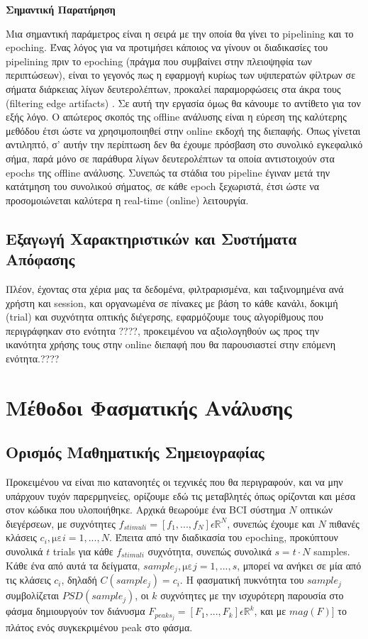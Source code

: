 \documentclass[11pt,a4paper,english,greek,twoside]{../Thesis}
\begin{document}
\textbf{Σημαντική Παρατήρηση}
\par Μια σημαντική παράμετρος είναι η σειρά με την οποία θα γίνει το pipelining και το epoching. Ένας λόγος για να προτιμήσει κάποιος να γίνουν οι διαδικασίες του pipelining πριν το epoching (πράγμα που συμβαίνει στην πλειοψηφία των περιπτώσεων), είναι το γεγονός πως η εφαρμογή κυρίως των υψιπερατών φίλτρων σε σήματα διάρκειας λίγων δευτερολέπτων, προκαλεί παραμορφώσεις στα άκρα τους (filtering edge artifacts) \cite{noauthor_undated-rl}\cite{Luck2014-mg}. Σε αυτή την εργασία όμως θα κάνουμε το αντίθετο για τον εξής λόγο. Ο απώτερος σκοπός της offline ανάλυσης είναι η εύρεση της καλύτερης μεθόδου έτσι ώστε να χρησιμοποιηθεί στην online εκδοχή της διεπαφής. Όπως γίνεται αντιληπτό, σ' αυτήν την περίπτωση δεν θα έχουμε πρόσβαση στο συνολικό εγκεφαλικό σήμα, παρά μόνο σε παράθυρα λίγων δευτερολέπτων τα οποία αντιστοιχούν στα epochs της offline ανάλυσης. Συνεπώς τα στάδια του pipeline έγιναν μετά την κατάτμηση του συνολικού σήματος, σε κάθε epoch ξεχωριστά, έτσι ώστε να προσομοιώνεται καλύτερα η real-time (online) λειτουργία.

\subsection{Εξαγωγή Χαρακτηριστικών και Συστήματα Απόφασης}
\label{subsec:featureExtract}
\par Πλέον, έχοντας στα χέρια μας τα δεδομένα, φιλτραρισμένα, και ταξινομημένα ανά χρήστη και session, και οργανωμένα σε πίνακες με βάση το κάθε κανάλι, δοκιμή (trial) και συχνότητα οπτικής διέγερσης, εφαρμόζουμε τους αλγορίθμους που περιγράφηκαν στο ενότητα ????, προκειμένου να αξιολογηθούν ως προς την ικανότητα χρήσης τους στην online διεπαφή που θα παρουσιαστεί στην επόμενη ενότητα.????

\section{Μέθοδοι Φασματικής Ανάλυσης}
\subsection{Ορισμός Μαθηματικής Σημειογραφίας}
\par Προκειμένου να είναι πιο κατανοητές οι τεχνικές που θα περιγραφούν, και να μην υπάρχουν τυχόν παρερμηνείες, ορίζουμε εδώ τις μεταβλητές όπως ορίζονται και μέσα στον κώδικα που υλοποιήθηκε. Αρχικά θεωρούμε ένα BCI σύστημα $N$ οπτικών διεγέρσεων, με συχνότητες $f_{stimuli} = [f_1,...,f_N] \epsilon \mathbb{R}^{N}$, συνεπώς έχουμε και $N$ πιθανές κλάσεις $c_i, \text{με} i=1,...,N$. Έπειτα από την διαδικασία του epoching, προκύπτουν συνολικά $t$ trials για κάθε $f_{stimuli} $ συχνότητα, συνεπώς συνολικά $s = t\cdot N$ samples. Κάθε ένα από αυτά τα δείγματα, $sample_j ,\text{με} j=1,...,s$, μπορεί να ανήκει σε μία από τις κλάσεις $c_i$, δηλαδή $C(sample_j) = c_i$. Η φασματική πυκνότητα του $sample_j$ συμβολίζεται $PSD(sample_j)$, οι $k$ συχνότητες με την ισχυρότερη παρουσία στο φάσμα δημιουργούν τον διάνυσμα $F_{peaks_{j}} = [F_1,...,F_k] \epsilon \mathbb{R}^{k}$, και με $mag(F)]$ το πλάτος ενός συγκεκριμένου peak στο φάσμα.
\end{document}
